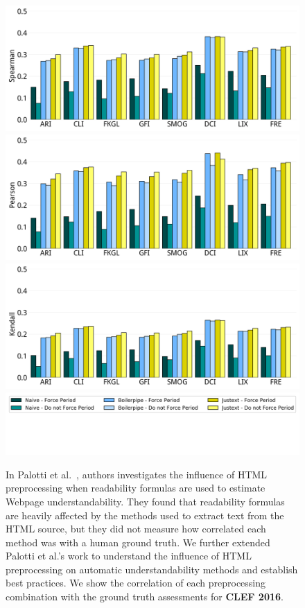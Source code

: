 \documentclass[10pt,a4paper]{article}
\begin{document}
\begin{figure}[h!]
	\centering
	\includegraphics[width=.6\textwidth]{appendix/bar_corr_spearman16_values}
	\includegraphics[width=.6\textwidth]{appendix/bar_corr_pearson16_values}
	\includegraphics[width=.6\textwidth]{appendix/bar_corr_kendalltau16_values}
	\includegraphics[width=.6\textwidth]{appendix/bar_raw_values}
    \caption{In Palotti et al.~\cite{palotti15}, authors investigates the influence of HTML preprocessing when readability formulas are used to estimate Webpage understandability. They found that readability formulas are heavily affected by the methods used to extract text from the HTML source, but they did not measure how correlated each method was with a human ground truth. We further extended Palotti et al.'s work to understand the influence of HTML preprocessing on automatic understandability methods and establish best practices. We show the correlation of each preprocessing combination with the ground truth assessments for \textbf{CLEF 2016}.}
	\label{fig:dist}
\end{figure}


\end{document}
